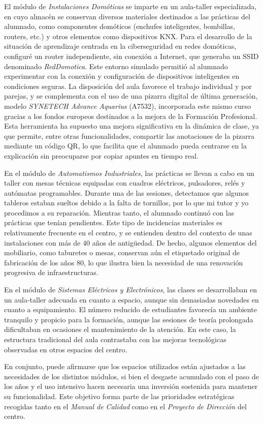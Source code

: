 El módulo de \textit{Instalaciones Domóticas} se imparte en un aula-taller especializada, en cuyo almacén se conservan diversos materiales destinados a las prácticas del alumnado, como componentes domóticos (enchufes inteligentes, bombillas, routers, etc.) y otros elementos como dispositivos KNX. Para el desarrollo de la situación de aprendizaje centrada en la ciberseguridad en redes domóticas, configuré un router independiente, sin conexión a Internet, que generaba un SSID denominado \textit{RedDomotica}. Este entorno simulado permitió al alumnado experimentar con la conexión y configuración de dispositivos inteligentes en condiciones seguras. La disposición del aula favorece el trabajo individual y por parejas, y se complementa con el uso de una pizarra digital de última generación, modelo \textit{SYNETECH Advance Aquarius} (A7532), incorporada este mismo curso gracias a los fondos europeos destinados a la mejora de la Formación Profesional. Esta herramienta ha supuesto una mejora significativa en la dinámica de clase, ya que permite, entre otras funcionalidades, compartir las anotaciones de la pizarra mediante un código QR, lo que facilita que el alumnado pueda centrarse en la explicación sin preocuparse por copiar apuntes en tiempo real.

En el módulo de \textit{Automatismos Industriales}, las prácticas se llevan a cabo en un taller con mesas técnicas equipadas con cuadros eléctricos, pulsadores, relés y autómatas programables. Durante una de las sesiones, detectamos que algunos tableros estaban sueltos debido a la falta de tornillos, por lo que mi tutor y yo procedimos a su reparación. Mientras tanto, el alumnado continuó con las prácticas que tenían pendientes. Este tipo de incidencias materiales es relativamente frecuente en el centro, y se entienden dentro del contexto de unas instalaciones con más de 40 años de antigüedad. De hecho, algunos elementos del mobiliario, como taburetes o mesas, conservan aún el etiquetado original de fabricación de los años 80, lo que ilustra bien la necesidad de una renovación progresiva de infraestructuras.

En el módulo de \textit{Sistemas Eléctricos y Electrónicos}, las clases se desarrollaban en un aula-taller adecuada en cuanto a espacio, aunque sin demasiadas novedades en cuanto a equipamiento. El número reducido de estudiantes favorecía un ambiente tranquilo y propicio para la formación, aunque las sesiones de teoría prolongada dificultaban en ocasiones el mantenimiento de la atención. En este caso, la estructura tradicional del aula contrastaba con las mejoras tecnológicas observadas en otros espacios del centro.

En conjunto, puede afirmarse que los espacios utilizados están ajustados a las necesidades de los distintos módulos, si bien el desgaste acumulado con el paso de los años y el uso intensivo hacen necesaria una inversión sostenida para mantener su funcionalidad. Este objetivo forma parte de las prioridades estratégicas recogidas tanto en el \textit{Manual de Calidad} \cite{politicaCalidadCanastell} como en el \textit{Proyecto de Dirección} \cite{proyectoDireccion2022} del centro.
